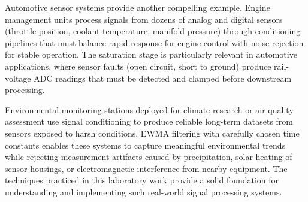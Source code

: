 Automotive sensor systems provide another compelling example. Engine management units process signals from dozens of analog and digital sensors (throttle position, coolant temperature, manifold pressure) through conditioning pipelines that must balance rapid response for engine control with noise rejection for stable operation. The saturation stage is particularly relevant in automotive applications, where sensor faults (open circuit, short to ground) produce rail-voltage ADC readings that must be detected and clamped before downstream processing.

Environmental monitoring stations deployed for climate research or air quality assessment use signal conditioning to produce reliable long-term datasets from sensors exposed to harsh conditions. EWMA filtering with carefully chosen time constants enables these systems to capture meaningful environmental trends while rejecting measurement artifacts caused by precipitation, solar heating of sensor housings, or electromagnetic interference from nearby equipment. The techniques practiced in this laboratory work provide a solid foundation for understanding and implementing such real-world signal processing systems.
